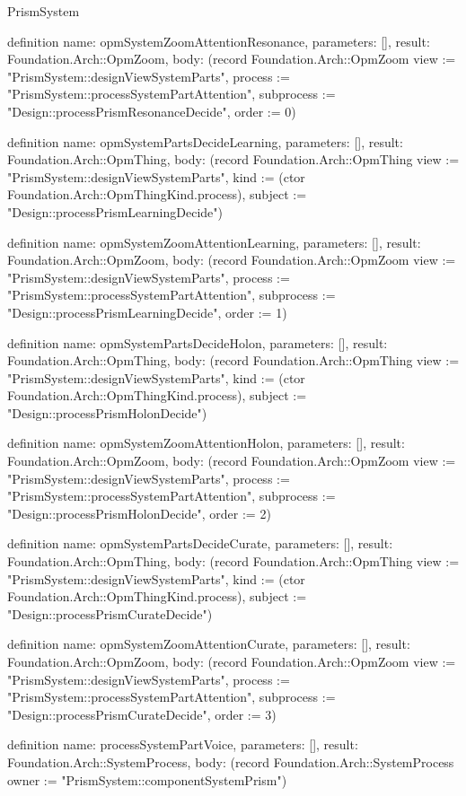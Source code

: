 \begin{lexlean}{PrismSystem}
\begin{semanticmodule}
definition{
  name: opmSystemZoomAttentionResonance,
  parameters: [],
  result: Foundation.Arch::OpmZoom,
  body: (record Foundation.Arch::OpmZoom {view := "PrismSystem::designViewSystemParts", process := "PrismSystem::processSystemPartAttention", subprocess := "Design::processPrismResonanceDecide", order := 0})
}

definition{
  name: opmSystemPartsDecideLearning,
  parameters: [],
  result: Foundation.Arch::OpmThing,
  body: (record Foundation.Arch::OpmThing {view := "PrismSystem::designViewSystemParts", kind := (ctor Foundation.Arch::OpmThingKind.process), subject := "Design::processPrismLearningDecide"})
}

definition{
  name: opmSystemZoomAttentionLearning,
  parameters: [],
  result: Foundation.Arch::OpmZoom,
  body: (record Foundation.Arch::OpmZoom {view := "PrismSystem::designViewSystemParts", process := "PrismSystem::processSystemPartAttention", subprocess := "Design::processPrismLearningDecide", order := 1})
}

definition{
  name: opmSystemPartsDecideHolon,
  parameters: [],
  result: Foundation.Arch::OpmThing,
  body: (record Foundation.Arch::OpmThing {view := "PrismSystem::designViewSystemParts", kind := (ctor Foundation.Arch::OpmThingKind.process), subject := "Design::processPrismHolonDecide"})
}

definition{
  name: opmSystemZoomAttentionHolon,
  parameters: [],
  result: Foundation.Arch::OpmZoom,
  body: (record Foundation.Arch::OpmZoom {view := "PrismSystem::designViewSystemParts", process := "PrismSystem::processSystemPartAttention", subprocess := "Design::processPrismHolonDecide", order := 2})
}

definition{
  name: opmSystemPartsDecideCurate,
  parameters: [],
  result: Foundation.Arch::OpmThing,
  body: (record Foundation.Arch::OpmThing {view := "PrismSystem::designViewSystemParts", kind := (ctor Foundation.Arch::OpmThingKind.process), subject := "Design::processPrismCurateDecide"})
}

definition{
  name: opmSystemZoomAttentionCurate,
  parameters: [],
  result: Foundation.Arch::OpmZoom,
  body: (record Foundation.Arch::OpmZoom {view := "PrismSystem::designViewSystemParts", process := "PrismSystem::processSystemPartAttention", subprocess := "Design::processPrismCurateDecide", order := 3})
}

definition{
  name: processSystemPartVoice,
  parameters: [],
  result: Foundation.Arch::SystemProcess,
  body: (record Foundation.Arch::SystemProcess {owner := "PrismSystem::componentSystemPrism"})
}


\end{semanticmodule}
\end{lexlean}
